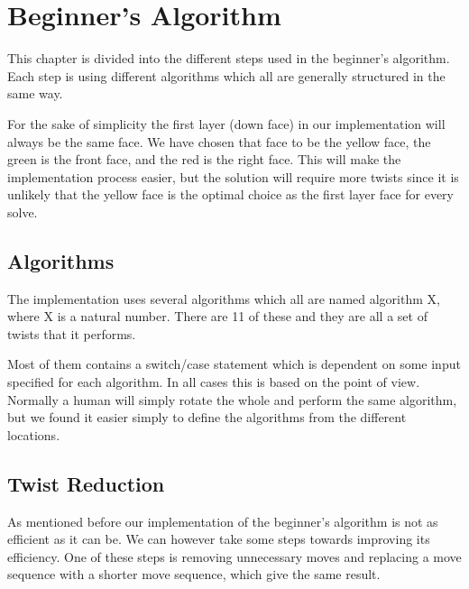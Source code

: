 \chapter{Beginner's Algorithm}
This chapter is divided into the different steps used in the beginner's algorithm.
Each step is using different algorithms which all are generally structured in the same way. 

For the sake of simplicity the first layer (down face) in our implementation will always be the same face. We have chosen that face to be the yellow face, the green is the front face, and the red is the right face. This will make the implementation process easier, but the solution will require more twists since it is unlikely that the yellow face is the optimal choice as the first layer face for every solve.

\section{Algorithms}
The implementation uses several algorithms which all are named algorithm X, where X is a natural number. There are 11 of these and they are all a set of twists that it performs. 

Most of them contains a switch/case statement which is dependent on some input specified for each algorithm. In all cases this is based on the point of view. Normally a human will simply rotate the whole \cube{} and perform the same algorithm, but we found it easier simply to define the algorithms from the different locations.









\section{Twist Reduction}
As mentioned before our implementation of the beginner's algorithm is not as efficient as it can be. We can however take some steps towards improving its efficiency. One of these steps is removing unnecessary moves and replacing a move sequence with a shorter move sequence, which give the same result.

